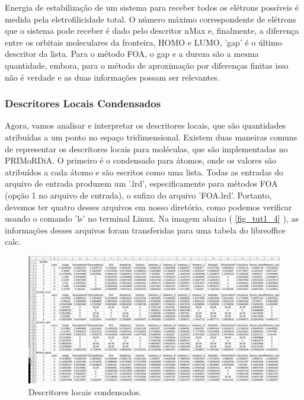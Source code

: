 \documentclass[a4paper,11pt]{refart}
\begin{document}
Energia de estabilização de um sistema para receber todos os elétrons possíveis é medida pela eletrofilicidade total. O número máximo correspondente de elétrons que o sistema pode receber é dado pelo descritor nMax e, finalmente, a diferença entre os orbitais moleculares da fronteira, HOMO e LUMO, 'gap' é o último descritor da lista. Para o método FOA, o gap e a dureza são a mesma quantidade, embora, para o método de aproximação por diferenças finitas isso não é verdade e as duas informações possam ser relevantes.


\subsubsection{Descritores Locais Condensados}

Agora, vamos analisar e interpretar os descritores locais, que são quantidades atribuídas a um ponto no espaço tridimensional. Existem duas maneiras comuns de representar os descritores locais para moléculas, que são implementadas no PRIMoRDiA. O primeiro é o condensado para átomos, onde os valores são atribuídos a cada átomo e são escritos como uma lista. Todas as entradas do arquivo de entrada produzem um '.lrd', especificamente para métodos FOA (opção 1 no arquivo de entrada), o sufixo do arquivo 'FOA.lrd'. Portanto, devemos ter quatro desses arquivos em nosso diretório, como podemos verificar usando o comando 'ls' no terminal Linux. Na imagem abaixo ( \autoref{fig_tut1_4} ), as informações desses arquivos foram transferidas para uma tabela do libreoffice calc.

\hspace*{-\leftmarginwidth}
\begin{minipage}{\fullwidth}
\begin{figure}[H]
\begin{center}
\includegraphics[width=6in]{images/img5}
\caption{Descritores locais condensados.}
\label{fig_tut1_4}
\end{center}
\end{figure}
\end{minipage}
\end{document}
